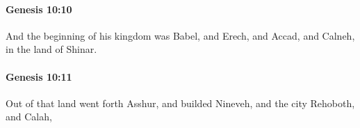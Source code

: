 		\paragraph{Genesis 10:10} %
			\label{GENESIS-10-10}

			And the beginning of his kingdom was Babel, and Erech, and Accad, and Calneh, in the land of Shinar.


		\paragraph{Genesis 10:11} %
			\label{GENESIS-10-11}

			Out of that land went forth Asshur, and builded Nineveh, and the city Rehoboth, and Calah,


